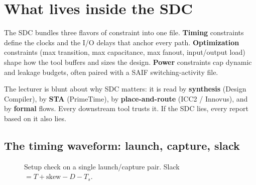 \section{What lives inside the SDC}

The SDC bundles three flavors of constraint into one file. \textbf{Timing} constraints define the clocks and the I/O delays that anchor every path. \textbf{Optimization} constraints (max transition, max capacitance, max fanout, input/output load) shape how the tool buffers and sizes the design. \textbf{Power} constraints cap dynamic and leakage budgets, often paired with a SAIF switching-activity file.

The lecturer is blunt about why SDC matters: it is read by \textbf{synthesis} (Design Compiler), by \textbf{STA} (PrimeTime), by \textbf{place-and-route} (ICC2 / Innovus), and by \textbf{formal} flows. Every downstream tool trusts it. If the SDC lies, every report based on it also lies.

\subsection{The timing waveform: launch, capture, slack}

\begin{figure}[h]
\centering
{}
\caption{Setup check on a single launch/capture pair. Slack $= T + \text{skew} - D - T_s$.}
\end{figure}

